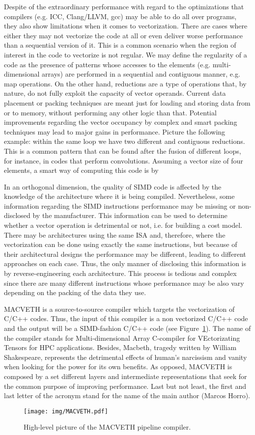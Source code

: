 Despite of the extraordinary performance with regard to the optimizations that
compilers (e.g. ICC, Clang/LLVM, gcc) may be able to do all over programs, they 
also
show limitations when it comes to vectorization. There are cases where either
they may not vectorize the code at all or even deliver worse performance than a
sequential version of it. This is a common scenario when the region of interest
in the code to vectorize is not regular. We may define the regularity of a code
as the presence of patterns whose accesses to the elements (e.g.
multi-dimensional arrays) are performed in a sequential and contiguous manner,
e.g. map operations. On the other hand, reductions are a type of operations
that, by nature,
do not fully exploit the capacity of vector operands. Current data placement or
packing techniques are meant just for loading and storing data from or to
memory, without performing any other logic than that. Potential improvements
regarding the vector occupancy by complex and smart packing techniques may lead
to major gains in performance. Picture the following example: within the same
loop we have two different and contiguous reductions. This is a common pattern
that can be found after the fusion of different loops, for instance, in codes
that perform convolutions. Assuming a vector size of four elements, a smart way
of computing this code is by

In an orthogonal dimension, the quality of SIMD code is affected by the 
knowledge of the architecture where it is being compiled. Nevertheless, some 
information regarding the SIMD instructions performance may be missing or 
non-disclosed by the manufacturer. This information can be used to determine 
whether a vector operation is detrimental or not, i.e. for building a cost 
model. There may be architectures using the same ISA and, therefore, where the 
vectorization can be done using exactly the same instructions, but because of 
their architectural designs the performance may be different, leading to 
different approaches on each case. Thus, the only manner of disclosing this 
information is by reverse-engineering each architecture. This process is 
tedious and complex since there are many different instructions whose 
performance may be also vary depending on the packing of the data they use.


MACVETH is a source-to-source compiler which targets the vectorization of C/C++
codes. Thus, the input of this compiler is a non vectorized C/C++ code and the
output will be a SIMD-fashion C/C++ code (see Figure~\ref{fig:MACVETHarch}).
The name of the compiler stands for Multi-dimensional Array C-compiler for
VEctorizating Tensors for HPC applications. Besides, Macbeth, tragedy
written by William Shakespeare, represents the detrimental effects of human's
narcissism and vanity when looking for the power for its own benefits. As
opposed, MACVETH is composed by a set different layers and intermediate
representations that seek for the common purpose of improving performance. Last
but not least, the first and last letter of the acronym stand for the name of
the main author (Marcos Horro).

\begin{figure}
	\centering
	\texttt{[image: img/MACVETH.pdf]}
	\caption{High-level picture of the MACVETH pipeline compiler.}
	\label{fig:MACVETHarch}
\end{figure}
